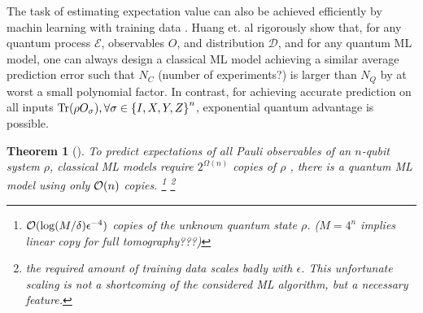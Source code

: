 \documentclass[
aps,
pra,
twocolumn,
floatfix,
]{revtex4-2}
\theoremstyle{plain}
\newtheorem{theorem}{Theorem}
\theoremstyle{definition}
\newcommand{\ob}{O}
\newcommand{\pob}{O}
\newcommand{\dm}{\rho}
\begin{document}
The task of estimating expectation value can also be achieved efficiently by machin learning with training data \cite{gaoEfficientRepresentationQuantum2017} \cite{torlaiManybodyQuantumState2018} \cite{huangPowerDataQuantum2021} \cite{huangProvablyEfficientMachine2022} \cite{zhuFlexibleLearningQuantum2022}.
Huang et. al rigorously show that, for any quantum process $\mathcal{E}$, observables $\ob$, and distribution $\mathcal{D}$, and for any quantum ML model, one can always design a classical ML model achieving a similar average prediction error such that $N_C$ (number of experiments?) is larger than $N_Q$ by at worst a small polynomial factor.
In contrast, for achieving accurate prediction on all inputs $\Tr(\dm\pob_{\sigma} ), \forall \sigma \in \qty{ I, X, Y, Z }^n$, exponential quantum advantage is possible.
\begin{theorem}[\cite{huangInformationtheoreticBoundsQuantum2021}]\label{thm:quantum_ml_estimate_bound}
	To predict expectations of all Pauli observables of an $n$-qubit system $\dm$, classical ML models require $2^{\Omega(n)}$ copies of $\dm$ , 
	there is a quantum ML model using only $\mathcal{O}(n)$ copies.
	\footnote{
		$\mathcal{O}(\log(M/\delta)\epsilon^{-4})$ copies of the unknown quantum state $\dm$.
		($M=4^n$ implies linear copy for full tomography???)
	}
	\footnote{
		the required amount of training data scales badly with $\epsilon$. This unfortunate scaling is not a shortcoming of the considered ML algorithm, but a necessary feature.
	}
\end{theorem}
\end{document}
